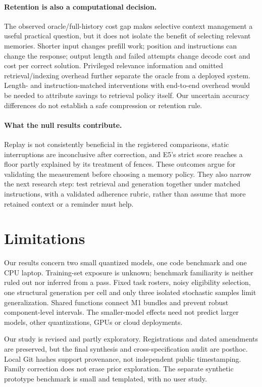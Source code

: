 \documentclass[10pt,a4paper,twocolumn]{article}
\begin{document}
\paragraph{Retention is also a computational decision.}
The observed oracle/full-history cost gap makes selective context management a
useful practical question, but it does not isolate the benefit of selecting
relevant memories. Shorter input changes prefill work; position and instructions
can change the response; output length and failed attempts change decode cost
and cost per correct solution. Privileged relevance information and omitted
retrieval/indexing overhead further separate the oracle from a deployed system.
Length- and instruction-matched interventions with end-to-end overhead would be
needed to attribute savings to retrieval policy itself. Our uncertain accuracy
differences do not establish a safe compression or retention rule.

\paragraph{What the null results contribute.}
Replay is not consistently beneficial in the registered comparisons, static
interruptions are inconclusive after correction, and E5's strict score reaches
a floor partly explained by its treatment of fences. These outcomes argue for
validating the measurement before choosing a memory policy. They also narrow
the next research step: test retrieval and generation together under matched
instructions, with a validated adherence rubric, rather than assume that more
retained context or a reminder must help.

\section{Limitations}
Our results concern two small quantized models, one code benchmark and one CPU
laptop. Training-set exposure is unknown; benchmark familiarity is neither ruled
out nor inferred from a pass. Fixed task rosters, noisy eligibility selection,
one structural generation per cell and only three isolated stochastic samples
limit generalization. Shared functions connect M1 bundles and prevent robust
component-level intervals. The smaller-model effects need not predict larger
models, other quantizations, GPUs or cloud deployments.

Our study is revised and partly exploratory. Registrations and dated amendments
are preserved, but the final synthesis and cross-specification audit are
posthoc. Local Git hashes support provenance, not independent public
timestamping. Family correction does not erase prior exploration. The separate
synthetic prototype benchmark is small and templated, with no user study.
\end{document}
